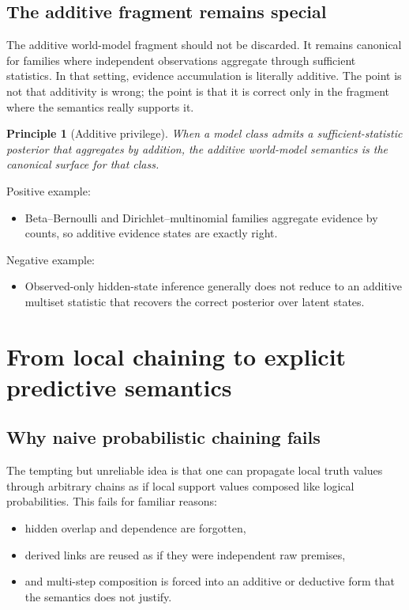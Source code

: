 \documentclass[11pt]{article}
\newtheorem{principle}{Principle}
\newcommand{\wm}{world-model}
\begin{document}
\subsection{The additive fragment remains special}

The additive \wm{} fragment should not be discarded.  It remains canonical for
families where independent observations aggregate through sufficient
statistics.  In that setting, evidence accumulation is literally additive.  The
point is not that additivity is wrong; the point is that it is correct only in
the fragment where the semantics really supports it.

\begin{principle}[Additive privilege]
When a model class admits a sufficient-statistic posterior that aggregates by
addition, the additive world-model semantics is the canonical surface for that
class.
\end{principle}

Positive example:
\begin{itemize}
  \item Beta--Bernoulli and Dirichlet--multinomial families aggregate evidence
        by counts, so additive evidence states are exactly right.
\end{itemize}

Negative example:
\begin{itemize}
  \item Observed-only hidden-state inference generally does not reduce to an
        additive multiset statistic that recovers the correct posterior over
        latent states.
\end{itemize}

\section{From local chaining to explicit predictive semantics}

\subsection{Why naive probabilistic chaining fails}

The tempting but unreliable idea is that one can propagate local truth values
through arbitrary chains as if local support values composed like logical
probabilities.  This fails for familiar reasons:
\begin{itemize}
  \item hidden overlap and dependence are forgotten,
  \item derived links are reused as if they were independent raw premises,
  \item and multi-step composition is forced into an additive or deductive form
        that the semantics does not justify.
\end{itemize}
\end{document}
